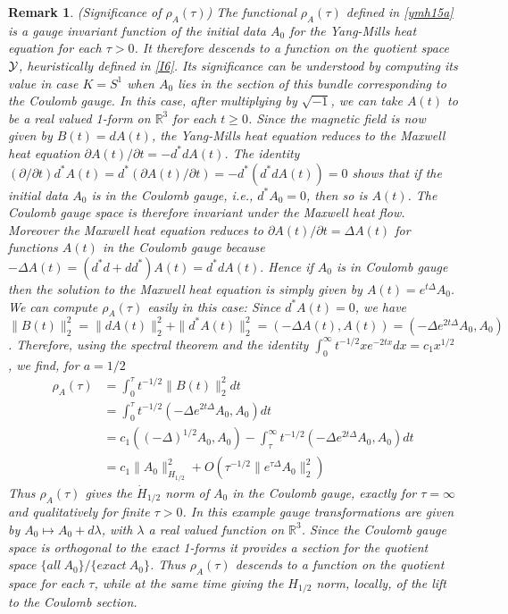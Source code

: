 \documentclass[12pt]{article}
\newtheorem{remark}[theorem]{Remark}
\def \R{\mathbb R}
\def \Y{{\cal Y}}
\def \p{\partial}
\def \eref{\eqref}
\numberwithin{equation}{section}
\begin{document}
          \begin{remark}\label{remsig}{\rm (Significance of $\rho_A(\tau)$) 
The functional $\rho_A(\tau)$ 
 defined in \eref{ymh15a} is a gauge invariant function of the initial data $A_0$
for the Yang-Mills heat equation for each $\tau >0$. 
 It therefore descends to a function on the quotient space $\Y$,
heuristically defined in \eref{I6}. Its significance can be understood by computing its value
in case $K= S^1$ when  $A_0$ lies in the  section of this bundle corresponding to the Coulomb gauge.
         In this case, after multiplying by
   $\sqrt{-1}$, we can take $A(t)$ to be a real valued 1-form on $\R^3$ for each
    $t \ge 0$. Since the magnetic field is now given by $B(t) = dA(t)$, the Yang-Mills heat equation
    reduces to the Maxwell  heat equation   $\p A(t)/\p t = -d^*d A(t)$.        
    The identity 
    $(\p/\p t) d^*A(t) = d^* (\p A(t)/\p t) = -d^* (d^*dA(t)) = 0$
    shows that if the initial
    data $A_0$ is in the Coulomb gauge, i.e., $d^*A_0 = 0$, then so is $A(t)$.    
  The Coulomb gauge space is therefore invariant under the Maxwell heat flow.
   Moreover the Maxwell heat equation 
   reduces to  $\p A(t)/\p t = \Delta A(t)$ for functions $A(t)$  in the Coulomb gauge because
   $-\Delta A(t) = (d^*d + dd^*) A (t) = d^*d A(t).$      
   Hence if $A_0$ is in Coulomb gauge then the solution to the Maxwell heat equation is simply given by  
   $A(t) = e^{t\Delta} A_0$.  We can compute $\rho_A(\tau)$ easily in this case:
   Since $d^*A(t) =0$, we have   $\|B(t)\|_2^2 = \|dA(t)\|_2^2 + \| d^*A(t)\|_2^2 =
   (-\Delta A(t), A(t)) = (-\Delta e^{2t\Delta} A_0, A_0)$. 
   Therefore, using the spectral theorem and the identity 
   $\int_0^\infty t^{-1/2} x e^{-2tx} dx = c_1 x^{1/2}$, we find, for $a = 1/2$
   \begin{align*}
   \rho_A(\tau)&=\int_0^\tau t^{-1/2} \|B(t)\|_2^2 dt\\
   &=\int_0^\tau t^{-1/2}  (-\Delta e^{2t\Delta} A_0, A_0)dt\\
   & = c_1 ((-\Delta)^{1/2} A_0, A_0)  -\int_\tau^\infty  t^{-1/2}  (-\Delta e^{2t\Delta} A_0, A_0)dt \\ 
   &= c_1 \|A_0\|_{H_{1/2}}^2+   O(\tau^{-1/2} \|e^{\tau \Delta}A_0\|_2^2) 
   \end{align*}
 Thus $\rho_A(\tau) $ gives the $\dot H_{1/2}$ norm of $A_0$ in the Coulomb gauge,
  exactly for $\tau = \infty$  and qualitatively for  finite $\tau >0$.   
 In this example gauge transformations are given by $A_0 \mapsto A_0 + d\lambda$, with $\lambda$
   a  real  valued function  on $\R^3$. Since the Coulomb gauge space is orthogonal to the 
    exact 1-forms it provides a section for the quotient space  $\{all\  A_0\}/ \{exact\ A_0\}$. 
    Thus  $\rho_A(\tau)$     
    descends to a function on the quotient space for each $\tau$, while at the same time 
    giving the $H_{1/2}$ norm, locally,  of the lift to the Coulomb section. 
}
\end{remark}
\end{document}

